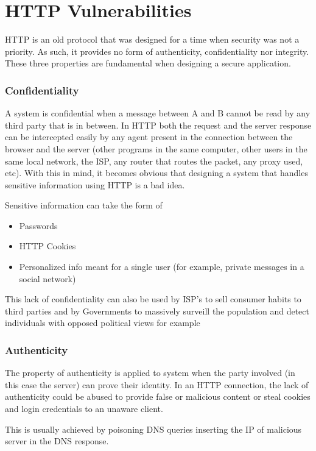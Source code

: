 \section{HTTP Vulnerabilities}
HTTP is an old protocol that was designed for a time when security was not a priority. As such, it provides no form of authenticity, confidentiality nor integrity. These three properties are fundamental when designing a secure application.	

\subsubsection{Confidentiality}
A system is confidential when a message between A and B cannot be read by any third party that is in between. In HTTP both the request and the server response can be intercepted easily by any agent present in the connection between the browser and the server (other programs in the same computer, other users in the same local network, the ISP, any router that routes the packet, any proxy used, etc). With this in mind, it becomes obvious that designing a system that handles sensitive information using HTTP is a bad idea.

Sensitive information can take the form of
\begin{itemize}
	\item Passwords
	\item HTTP Cookies
	\item Personalized info meant for a single user (for example, private messages in a social network)
\end{itemize}

This lack of confidentiality can also be used by ISP's to sell consumer habits to third parties and by Governments to massively surveill the population and detect individuals with opposed political views for example

\subsubsection{Authenticity}
The property of authenticity is applied to system when the party involved (in this case the server) can prove their identity. In an HTTP connection, the lack of authenticity could be abused to provide false or malicious content or steal cookies and login credentials to an unaware client. 

This is usually achieved by poisoning DNS queries inserting the IP of malicious server in the DNS response.

